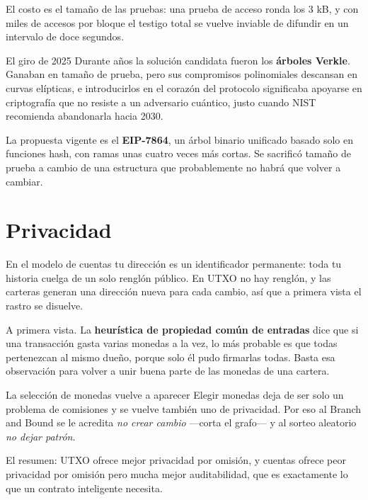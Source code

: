 \documentclass[11pt,a4paper]{article}
\theoremstyle{definition}
\theoremstyle{plain}
\theoremstyle{remark}
\begin{document}
El costo es el tamaño de las pruebas: una prueba de acceso ronda los 3 kB, y con
miles de accesos por bloque el testigo total se vuelve inviable de difundir en un
intervalo de doce segundos.

\begin{nota}{El giro de 2025}
Durante años la solución candidata fueron los \textbf{árboles Verkle}. Ganaban en
tamaño de prueba, pero sus compromisos polinomiales descansan en curvas
elípticas, e introducirlos en el corazón del protocolo significaba apoyarse en
criptografía que no resiste a un adversario cuántico, justo cuando NIST
recomienda abandonarla hacia 2030.

La propuesta vigente es el \textbf{EIP-7864}, un árbol binario unificado basado
solo en funciones hash, con ramas unas cuatro veces más cortas. Se sacrificó
tamaño de prueba a cambio de una estructura que probablemente no habrá que volver
a cambiar.
\end{nota}

\section{Privacidad}\label{sec:privacidad}

En el modelo de cuentas tu dirección es un identificador permanente: toda tu
historia cuelga de un solo renglón público. En UTXO no hay renglón, y las
carteras generan una dirección nueva para cada cambio, así que a primera vista el
rastro se disuelve.

A primera vista. La \textbf{heurística de propiedad común de entradas} dice que
si una transacción gasta varias monedas a la vez, lo más probable es que todas
pertenezcan al mismo dueño, porque solo él pudo firmarlas todas. Basta esa
observación para volver a unir buena parte de las monedas de una cartera.

\begin{clave}{La selección de monedas vuelve a aparecer}
Elegir monedas deja de ser solo un problema de comisiones y se vuelve también uno
de privacidad. Por eso al Branch and Bound se le acredita \emph{no crear cambio}
—corta el grafo— y al sorteo aleatorio \emph{no dejar patrón}.
\end{clave}

El resumen: UTXO ofrece mejor privacidad por omisión, y cuentas ofrece peor
privacidad por omisión pero mucha mejor auditabilidad, que es exactamente lo que
un contrato inteligente necesita.
\end{document}
